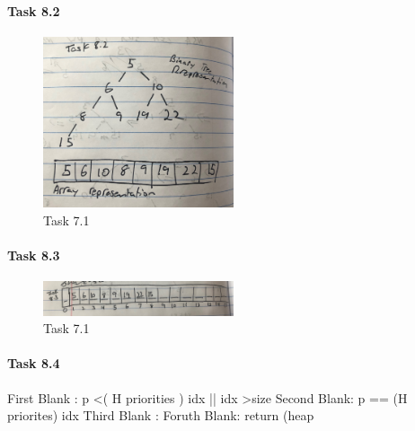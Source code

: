 \documentclass[11pt]{article}
\begin{document}
\paragraph{Task 8.2}
\begin{figure}[htbp]
 \begin{center}
  \includegraphics[width=0.5\textwidth]{8_2.JPG}
  \caption{Task 7.1}
 \end{center}
\end{figure}

\paragraph{Task 8.3}
\begin{figure}[htbp]
 \begin{center}
  \includegraphics[width=0.5\textwidth]{8_3.JPG}
  \caption{Task 7.1}
 \end{center}
\end{figure}

\paragraph{Task 8.4}
\newline First Blank : p \textless \left( H \rightarrow priorities \right) \lbrack idx \rbrack || idx \textgreater size
\newline
\newline Second Blank: p == (H \rightarrow priorites) \lbrack idx \rbrack
\newline 
\newline Third Blank : 
\newline
\newline Foruth Blank: return (heap%
\newline
\end{document}
